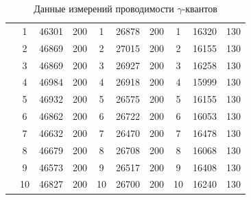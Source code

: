 \documentclass[a4paper, 12pt]{article}%
\begin{document}
\begin{table}[h]
\begin{center}
\begin{tabular}{|c|c|c|c|c|c|c|c|c|c|}
                     & 1                  & 46301 & 200        & 1                  & 26878 & 200        & 1                  & 16320 & 130        \\ \cline{2-10} 
                     & 2                  & 46869 & 200        & 2                  & 27015 & 200        & 2                  & 16155 & 130        \\ \cline{2-10} 
                     & 3                  & 46869 & 200        & 3                  & 26927 & 200        & 3                  & 16258 & 130        \\ \cline{2-10} 
                     & 4                  & 46984 & 200        & 4                  & 26918 & 200        & 4                  & 15999 & 130        \\ \cline{2-10} 
                     & 5                  & 46932 & 200        & 5                  & 26575 & 200        & 5                  & 16155 & 130        \\ \cline{2-10} 
                     & 6                  & 46862 & 200        & 6                  & 26722 & 200        & 6                  & 16053 & 130        \\ \cline{2-10} 
                     & 7                  & 46632 & 200        & 7                  & 26470 & 200        & 7                  & 16478 & 130        \\ \cline{2-10} 
                     & 8                  & 46679 & 200        & 8                  & 26708 & 200        & 8                  & 16068 & 130        \\ \cline{2-10} 
                     & 9                  & 46573 & 200        & 9                  & 26517 & 200        & 9                  & 16408 & 130        \\ \cline{2-10} 
                     & 10                 & 46827 & 200        & 10                 & 26700 & 200        & 10                 & 16240 & 130        \\ \hline
\end{tabular}
\caption{Данные измерений проводимости $\gamma$-квантов}
\end{center}
\end{table}
\end{document}
